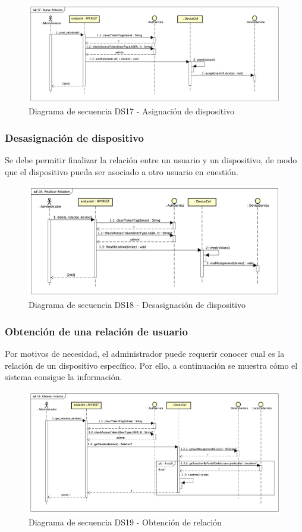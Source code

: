 \begin{figure}[H]
    \centering
    \includegraphics[width=14cm]{./img/sequence/diagram/NuevaRelacion.png}
    \caption{Diagrama de secuencia DS17 - Asignación de dispositivo}
    \label{fig:seq.AddUser}
\end{figure}

\subsubsection{Desasignación de dispositivo}

Se debe permitir finalizar la relación entre un usuario y un dispositivo, de modo que el dispositivo pueda ser asociado a otro usuario en cuestión.

\begin{figure}[H]
    \centering
    \includegraphics[width=14cm]{./img/sequence/diagram/FinalizarRelacion.png}
    \caption{Diagrama de secuencia DS18 - Desasignación de dispositivo}
    \label{fig:seq.AddUser}
\end{figure}

\subsubsection{Obtención de una relación de usuario}

Por motivos de necesidad, el administrador puede requerir conocer cual es la relación de un dispositivo específico. Por ello, a continuación se muestra cómo el sistema consigue la información.


\begin{figure}[H]
    \centering
    \includegraphics[width=14cm]{./img/sequence/diagram/ObtenerRelacion.png}
    \caption{Diagrama de secuencia DS19 - Obtención de relación}
    \label{fig:seq.AddUser}
\end{figure}
